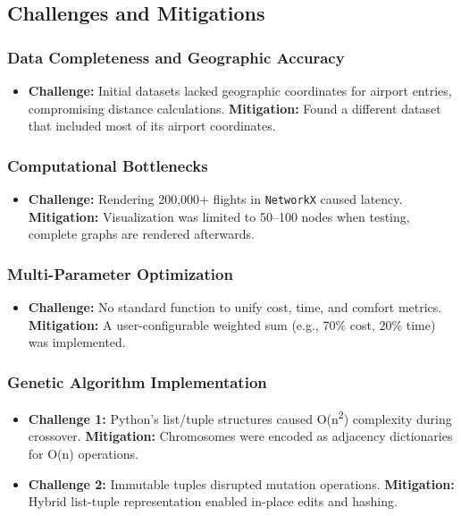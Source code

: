 \documentclass[conference]{IEEEtran}
\begin{document}
\subsection{Challenges and Mitigations}

\subsubsection{Data Completeness and Geographic Accuracy}
\begin{itemize}
    \item \textbf{Challenge:} Initial datasets lacked geographic coordinates for airport entries, compromising distance calculations.
    \textbf{Mitigation:} Found a different dataset that included most of its airport coordinates.
\end{itemize}

\subsubsection{Computational Bottlenecks}
\begin{itemize}
    \item \textbf{Challenge:} Rendering 200,000+ flights in \texttt{NetworkX} caused latency. 
    \textbf{Mitigation:} Visualization was limited to 50--100 nodes when testing, complete graphs are rendered afterwards.
\end{itemize}

\subsubsection{Multi-Parameter Optimization}
\begin{itemize}
    \item \textbf{Challenge:} No standard function to unify cost, time, and comfort metrics. 
    \textbf{Mitigation:} A user-configurable weighted sum (e.g., 70\% cost, 20\% time) was implemented.
\end{itemize}

\subsubsection{Genetic Algorithm Implementation}
\begin{itemize}
    \item \textbf{Challenge 1:} Python’s list/tuple structures caused O(n\textsuperscript{2}) complexity during crossover. 
    \textbf{Mitigation:} Chromosomes were encoded as adjacency dictionaries for O(n) operations.
    
    \item \textbf{Challenge 2:} Immutable tuples disrupted mutation operations. 
    \textbf{Mitigation:} Hybrid list-tuple representation enabled in-place edits and hashing.
\end{itemize}
\end{document}
